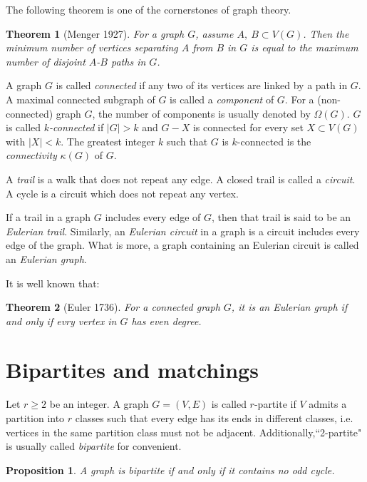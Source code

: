 \documentclass[12pt]{report}
\newtheorem{theorem}{Theorem}
\newtheorem{proposition}{Proposition}
\begin{document}
The following theorem is one of the cornerstones of graph theory.
\begin{theorem}[Menger 1927]\label{mengert27}
For a graph $G$, assume $A,~B\subset V(G)$. Then the minimum number of vertices separating $A$ from $B$ in $G$ is equal to the maximum number of disjoint $A$-$B$ paths in $G$.
\end{theorem}




A graph $G$ is called {\em connected} if any two of its vertices are linked by a path in $G$. A maximal connected subgraph of $G$ is called a {\em component} of $G$.  For a (non-connected) graph $G$, the number of components is usually denoted by $\Omega(G)$.
$G$ is called {\em $k$-connected} if $|G|>k$ and $G-X$ is connected for every set $X\subset V(G)$ with $|X|<k$. The greatest integer $k$ such that $G$ is $k$-connected is the {\em connectivity} $\kappa(G)$ of $G$.



A {\em trail} is a walk that does not repeat any edge.
A closed trail is called a {\em circuit}. A cycle is a circuit which does not repeat any vertex.


If a trail in a graph $G$ includes every edge of $G$, then that trail is said to be an {\em Eulerian trail}. Similarly, an {\em Eulerian circuit} in a graph is a circuit includes every edge of the graph. What is more, a graph containing an Eulerian circuit is called an {\em Eulerian graph}.

It is well known that:
\begin{theorem}[Euler 1736]
For a connected graph $G$, it is an Eulerian graph if and only if evry vertex in $G$ has even degree.
\end{theorem}



\section{Bipartites and matchings}

Let $r\ge2$ be an integer. A graph $G=(V,E)$ is called $r$-partite if $V$ admits a partition into $r$ classes such that every edge has its ends in different classes, i.e. vertices in the same partition class must not be adjacent. Additionally,``2-partite" is usually called {\em bipartite} for convenient.
\begin{proposition}\label{bipoefpro3}
A graph is bipartite if and only if it contains no odd cycle.
\end{proposition}
\end{document}
